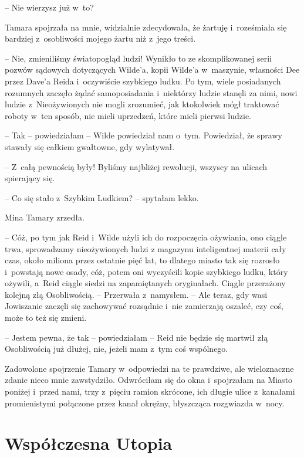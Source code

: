 \documentclass[oneside,polish,11pt,sfheadings]{mwbk}
\begin{document}
-- Nie wierzysz już w~to?

Tamara spojrzała na mnie, widzialnie zdecydowała, że żartuję i~roześmiała się bardziej z~osobliwości mojego żartu niż z~jego treści. 

-- Nie, zmieniliśmy światopogląd ludzi! Wynikło to ze skomplikowanej serii
pozwów sądowych dotyczących Wilde'a, kopii Wilde'a w~maszynie, własności
Dee przez Dave'a Reida i~oczywiście szybkiego ludku. Po tym, wiele
posiadanych rozumnych zaczęło żądać samoposiadania i~niektórzy ludzie
stanęli za nimi, nowi ludzie z~Nieożywionych nie mogli zrozumieć, jak
ktokolwiek mógł traktować roboty w~ten sposób, nie mieli uprzedzeń,
które mieli pierwsi ludzie.

-- Tak -- powiedziałam -- Wilde powiedział nam o~tym. Powiedział, że sprawy
stawały się całkiem gwałtowne, gdy wylatywał.

-- Z~całą pewnością były! Byliśmy najbliżej rewolucji, wszyscy na ulicach
spierający się.

-- Co się stało z~Szybkim Ludkiem? -- spytałam lekko.

Mina Tamary zrzedła. 

-- Cóż, po tym jak Reid i~Wilde użyli ich do
rozpoczęcia ożywiania, ono ciągle trwa, sprowadzamy nieożywionych ludzi
z magazynu inteligentnej materii cały czas, około miliona przez ostatnie
pięć lat, to dlatego miasto tak się rozrosło i~powstają nowe osady, cóż,
potem oni wyczyścili kopie szybkiego ludku, który ożywili, a~Reid ciągle
siedzi na zapamiętanych oryginałach. Ciągle przerażony kolejną złą
Osobliwością. -- Przerwała z~namysłem. -- Ale teraz, gdy wasi Jowiszanie
zaczęli się zachowywać rozsądnie i~nie zamierzają oszaleć, czy coś, może
to też się zmieni.

-- Jestem pewna, że tak -- powiedziałam -- Reid nie będzie się martwił złą
Osobliwością już dłużej, nie, jeżeli mam z~tym coś wspólnego.

Zadowolone spojrzenie Tamary w~odpowiedzi na te prawdziwe, ale
wieloznaczne zdanie nieco mnie zawstydziło. Odwróciłam się do okna i~spojrzałam na Miasto poniżej i~przed nami, trzy z~pięciu ramion
skrócone, ich długie ulice z~kanałami promienistymi połączone przez
kanał okrężny, błyszcząca rozgwiazda w~nocy.


\chapter{Współczesna Utopia}
\end{document}

